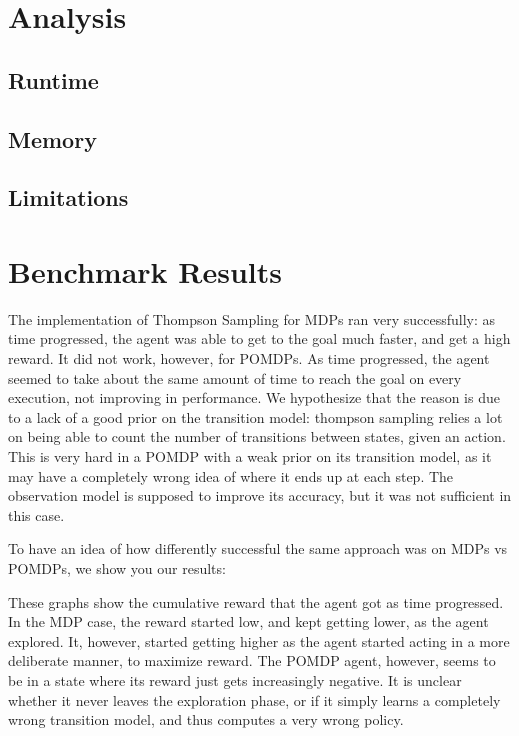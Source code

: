 \documentclass{pset}
\begin{document}
\section{Analysis}

\subsection{Runtime}

\subsection{Memory}

\subsection{Limitations}

\section{Benchmark Results}
The implementation of Thompson Sampling for MDPs ran very successfully: as time
progressed, the agent was able to get to the goal much faster, and get a high
reward. It did not work, however, for POMDPs. As time progressed, the agent seemed
to take about the same amount of time to reach the goal on every execution, not
improving in performance. We hypothesize that the reason is due to a lack of
a good prior on the transition model: thompson sampling relies a lot on being
able to count the number of transitions between states, given an action. This
is very hard in a POMDP with a weak prior on its transition model, as it may have
a completely wrong idea of where it ends up at each step. The observation model
is supposed to improve its accuracy, but it was not sufficient in this case.

To have an idea of how differently successful the same approach was on MDPs vs
POMDPs, we show you our results:


These graphs show the cumulative reward that the agent got as time progressed.
In the MDP case, the reward started low, and kept getting lower, as the agent
explored. It, however, started getting higher as the agent started acting in a
more deliberate manner, to maximize reward. The POMDP agent, however, seems to
be in a state where its reward just gets increasingly negative. It is unclear
whether it never leaves the exploration phase, or if it simply learns a completely
wrong transition model, and thus computes a very wrong policy.






\end{document}
